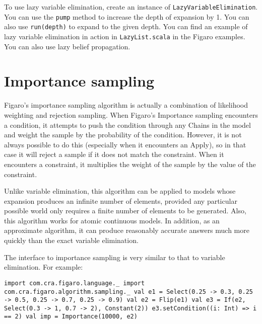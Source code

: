 To use lazy variable elimination, create an instance of \texttt{LazyVariable\-Elimination}. You can use the \texttt{pump} method to increase the depth of expansion by 1. You can also use \texttt{run(depth)} to expand to the given depth. You can find an example of lazy variable elimination in action in \texttt{LazyList.scala} in the Figaro examples. You can also use lazy belief propagation.

\section{Importance sampling}

Figaro's importance sampling algorithm is actually a combination of likelihood weighting and rejection sampling. When Figaro's Importance sampling encounters a condition, it attempts to push the condition through any Chains in the model and weight the sample by the probability of the condition. However, it is not always possible to do this (especially when it encounters an Apply), so in that case it will reject a sample if it does not match the constraint. When it encounters a constraint, it multiplies the weight of the sample by the value of the constraint.

Unlike variable elimination, this algorithm can be applied to models whose expansion produces an infinite number of elements, provided any particular possible world only requires a finite number of elements to be generated. Also, this algorithm works for atomic continuous models. In addition, as an approximate algorithm, it can produce reasonably accurate answers much more quickly than the exact variable elimination.

The interface to importance sampling is very similar to that to variable elimination. For example:

\begin{flushleft}
\texttt{import com.cra.figaro.language.\_
\newline import com.cra.figaro.algorithm.sampling.\_
\newline
\newline val e1 = Select(0.25 -> 0.3, 0.25 -> 0.5, 0.25 -> 0.7, 0.25 -> 0.9)
\newline val e2 = Flip(e1)
\newline val e3 = If(e2, Select(0.3 -> 1, 0.7 -> 2), Constant(2))
\newline e3.setCondition((i: Int) => i == 2)
\newline 
\newline val imp = Importance(10000, e2) }
\end{flushleft}


